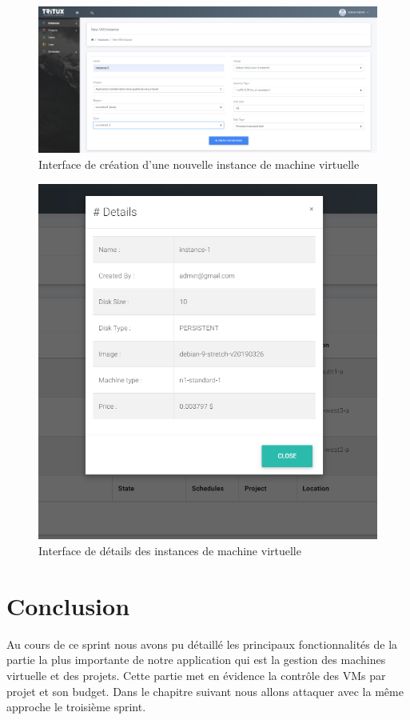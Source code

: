 \begin{figure}[H]
	\centering
	\includegraphics[scale=0.35]{createvm.png}
	\caption{Interface de création d'une nouvelle instance de machine virtuelle}
	\label{Interface de création d'une nouvelle instance de machine virtuelle}
\end{figure}
\begin{figure}[H]
	\centering
	\includegraphics[scale=0.35]{details.PNG}
	\caption{Interface de détails des instances de machine virtuelle}
	\label{Interface des détails des instances de machine virtuelle}
\end{figure}

\section{Conclusion}
Au cours de ce sprint nous avons pu détaillé les principaux fonctionnalités  de la partie la plus importante de notre application qui est la gestion des machines virtuelle et des projets. Cette partie met en évidence la contrôle des VMs par projet et son budget. Dans le
chapitre suivant nous allons attaquer avec la même approche le troisième sprint.